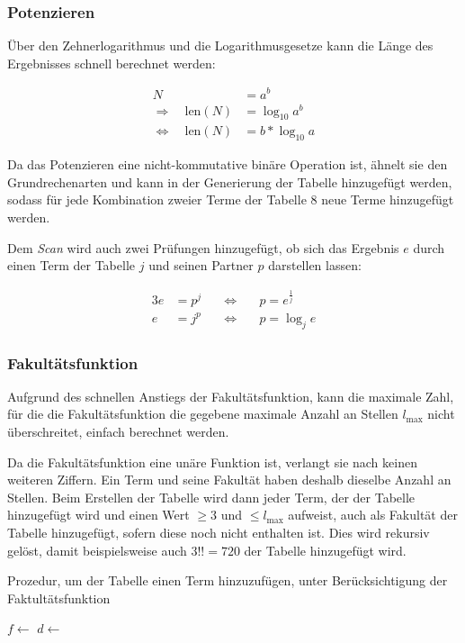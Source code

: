 \documentclass[a4paper,10pt,ngerman]{scrartcl}
\begin{document}
\subsubsection{Potenzieren}
Über den Zehnerlogarithmus und die Logarithmusgesetze kann die Länge des Ergebnisses schnell berechnet werden:

\begin{align*}
  N &= a^b \\
  \Rightarrow \quad \mathrm{len}(N) &= \log_{10}a^b \\
  \Leftrightarrow \quad \mathrm{len}(N) &= b * \log_{10}a
\end{align*}

Da das Potenzieren eine nicht-kommutative binäre Operation ist, ähnelt sie den Grundrechenarten und kann in der Generierung der Tabelle hinzugefügt werden, sodass für jede Kombination zweier Terme der Tabelle 8 neue Terme hinzugefügt werden.

Dem \textit{Scan} wird auch zwei Prüfungen hinzugefügt, ob sich das Ergebnis $e$ durch einen Term der Tabelle $j$ und seinen Partner $p$ darstellen lassen:

\begin{alignat*}{3}
  e &= p ^ j \quad &\Leftrightarrow& \quad p = e ^ {\frac{1}{j}} \\
  e &= j ^ p \quad &\Leftrightarrow& \quad p = \log_j e
\end{alignat*}

\subsubsection{Fakultätsfunktion}
Aufgrund des schnellen Anstiegs der Fakultätsfunktion, kann die maximale Zahl, für die die Fa\-kul\-täts\-funk\-tion die gegebene maximale Anzahl an Stellen $l_{\mathrm{max}}$ nicht überschreitet, einfach berechnet werden.

Da die Fakultätsfunktion eine unäre Funktion ist, verlangt sie nach keinen weiteren Ziffern.
Ein Term und seine Fakultät haben deshalb dieselbe Anzahl an Stellen.
Beim Erstellen der Tabelle wird dann jeder Term, der der Tabelle hinzugefügt wird und einen Wert $\geq 3$ und $\leq l_{\mathrm{max}}$ aufweist, auch als Fakultät der Tabelle hinzugefügt, sofern diese noch nicht enthalten ist.
Dies wird rekursiv gelöst, damit beispielsweise auch $3!! = 720$ der Tabelle hinzugefügt wird.

\begin{algorithm}
  \caption{Prozedur, um der Tabelle einen Term hinzuzufügen, unter Berücksichtigung der Faktultätsfunktion}
  \begin{algorithmic}[1]
        \State $f \gets $ 
        \State {}
      \EndIf
      \State $d \gets$ 
        \State {}
      \EndIf
    \EndProcedure
  \end{algorithmic}
  
\end{algorithm}
\end{document}
